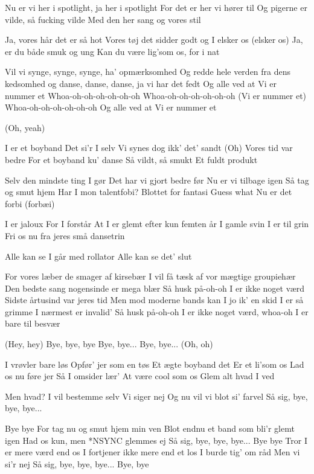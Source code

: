 \documentclass[a4paper,11pt]{article}
\begin{document}
\begin{song}

 Nu er vi her i spotlight, ja her i spotlight
For det er her vi hører til
Og pigerne er vilde, så fucking vilde
Med den her sang og vores stil

 Ja, vores hår det er så hot
Vores tøj det sidder godt og I elsker os (elsker os) 
Ja, er du både smuk og ung
Kan du være lig'som os, for i nat

 Vil vi synge, synge, synge, ha' opmærksomhed
Og redde hele verden fra dens kedsomhed
og danse, danse, danse, ja vi har det fedt
Og alle ved at
Vi er nummer et
Whoa-oh-oh-oh-oh-oh-oh
Whoa-oh-oh-oh-oh-oh-oh (Vi er nummer et)
Whoa-oh-oh-oh-oh-oh-oh
Og alle ved at
 Vi er nummer et


 (Oh, yeah)

 I er et boyband
Det si'r I selv
Vi synes dog ikk' det' sandt (Oh)
Vores tid var bedre
For et boyband ku' danse
 Så vildt, så smukt
Et fuldt produkt

Selv den mindste ting I gør
Det har vi gjort bedre før
Nu er vi tilbage igen
Så tag og smut hjem
Har I mon talentfobi?
Blottet for fantasi
Guess what
 Nu er det forbi (forbæi)


 I er jaloux
For I forstår
At I er glemt efter kun femten år
I gamle svin
I er til grin
Fri os nu fra jeres små dansetrin

 Alle kan se I går med rollator
Alle kan se det' slut

 For vores læber de smager af kirsebær
I vil få tæsk af vor mægtige groupiehær
Den bedste sang nogensinde er mega blær
Så husk på-oh-oh
I er ikke noget værd
Sidste årtusind var jeres tid
Men mod moderne bands kan I jo ik' en skid
I er så grimme I nærmest er invalid'
Så husk på-oh-oh
I er ikke noget værd, whoa-oh
 I er bare til besvær


 (Hey, hey)
 Bye, bye, bye
Bye, bye...
Bye, bye... (Oh, oh)

 I vrøvler bare løs
Opfør' jer som en tøs
Et ægte boyband det
Er et li'som os
Lad os nu føre jer
Så I omsider lær'
At være cool som os
Glem alt hvad I ved

Men hvad? I vil bestemme selv
Vi siger nej
Og nu vil vi blot si' farvel
Så sig, bye, bye, bye...

Bye bye
For tag nu og smut hjem min ven
Blot endnu et band som bli'r glemt igen
Had os kun, men *NSYNC glemmes ej
Så sig, bye, bye, bye...
Bye bye
Tror I er mere værd end os
I fortjener ikke mere end et los
I burde tig' om råd
Men vi si'r nej
Så sig, bye, bye, bye...
 Bye, bye
\end{song}
\end{document}
